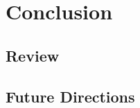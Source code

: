 \chapter{Conclusion}%
\label{sec:conclusion}

\section{Review}%
\label{sec:conclusion:review}

\section{Future Directions}%
\label{sec:conclusion:todo}
